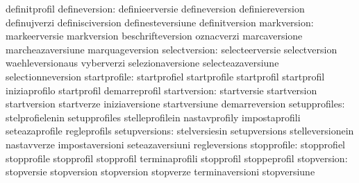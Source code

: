                                   definitprofil
                   defineversion: definieerversie                  defineversion
                                  definiereversion                 definujverzi
                                  definisciversion                 definesteversiune
                                  definitversion
                     markversion: markeerversie                    markversion
                                  beschrifteversion                oznacverzi
                                  marcaversione                    marcheazaversiune
                                  marquageversion
                   selectversion: selecteerversie                  selectversion
                                  waehleversionaus                 vyberverzi
                                  selezionaversione                selecteazaversiune
                                  selectionneversion
                    startprofile: startprofiel                     startprofile
                                  startprofil                      startprofil
                                  iniziaprofilo                    startprofil
                                  demarreprofil
                    startversion: startversie                      startversion
                                  startversion                     startverze
                                  iniziaversione                   startversiune
                                  demarreversion
                   setupprofiles: stelprofielenin                  setupprofiles
                                  stelleprofilein                  nastavprofily
                                  impostaprofili                   seteazaprofile
                                  regleprofils
                   setupversions: stelversiesin                    setupversions
                                  stelleversionein                 nastavverze
                                  impostaversioni                  seteazaversiuni
                                  regleversions
                     stopprofile: stopprofiel                      stopprofile
                                  stopprofil                       stopprofil
                                  terminaprofili                   stopprofil
                                  stoppeprofil
                     stopversion: stopversie                       stopversion
                                  stopversion                      stopverze
                                  terminaversioni                  stopversiune
